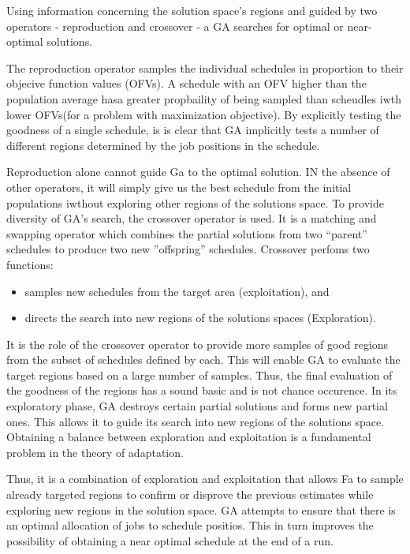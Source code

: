 \documentclass[pdftex,11pt]{article}
\begin{document}
Using information concerning the solution space's regions and guided by two operators - reproduction and crossover - a GA searches for optimal or near-optimal solutions.

The reproduction operator samples the individual schedules in proportion to their objecive function values (OFVs). A schedule with an OFV higher than the population average hasa greater propbaility of being sampled than scheudles iwth lower OFVs(for a problem with maximization objective). By explicitly testing the goodness of a single schedule, is is clear that GA implicitly tests a number of different regions determined by the job positions in the schedule.

Reproduction alone cannot guide Ga to the optimal solution. IN the absence of other operators, it will simply give us the best schedule from the initial populations iwthout exploring other regions of the solutions space. To provide diversity of GA's search, the crossover operator is used. It is a matching and swapping operator which combines the partial solutions from two ``parent'' schedules to produce two new ''offspring'' schedules. Crossover perfoms two functions:
\begin{itemize}
\item samples new schedules from the target area (exploitation), and
\item directs the search into new regions of the solutions spaces (Exploration).
\end{itemize}

It is the role of the crossover operator to provide more samples of good regions from the subset of schedules defined by each. This will enable GA to evaluate the target regions based on a large number of samples. Thus, the final evaluation of the goodness of the regions has a sound basic and is not chance occurence. In its exploratory phase, GA destroys certain partial solutions and forms new partial ones. This allows it to guide its search into new regions of the solutions space. Obtaining a balance between exploration and exploitation is a fundamental problem in the theory of adaptation.

Thus, it is a combination of exploration and exploitation that allows Fa to sample already targeted regions to confirm or disprove the previous estimates while exploring new regions in the solution space. GA attempts to ensure that there is an optimal allocation of jobs to schedule positios. This in turn improves the possibility of obtaining a near optimal schedule at the end of a run.
\end{document}
